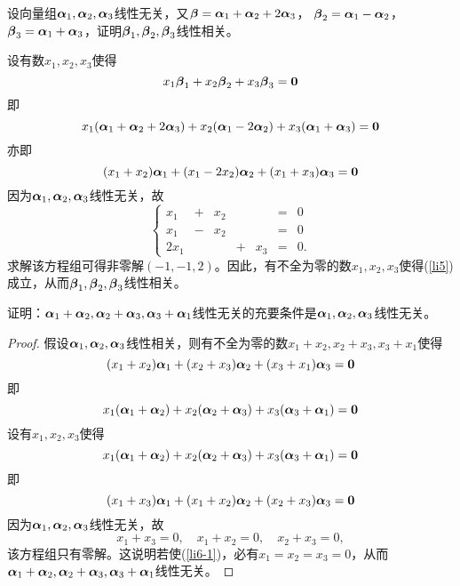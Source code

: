 \begin{frame}
\begin{li}
  设向量组$\boldsymbol{\alpha}_1,\boldsymbol{\alpha}_2,\boldsymbol{\alpha}_3$线性无关，又$\boldsymbol{\beta}=\boldsymbol{\alpha}_1+\boldsymbol{\alpha}_2+2\boldsymbol{\alpha}_3$，
  $\boldsymbol{\beta}_2=\boldsymbol{\alpha}_1-\boldsymbol{\alpha}_2$，$\boldsymbol{\beta}_3=\boldsymbol{\alpha}_1+\boldsymbol{\alpha}_3$，证明$\boldsymbol{\beta}_1,\boldsymbol{\beta}_2,\boldsymbol{\beta}_3$线性相关。       
\end{li} \pause 
\begin{jie}
设有数$x_1,x_2,x_3$使得
\begin{equation}\label{li5}
  x_1\boldsymbol{\beta}_1+x_2\boldsymbol{\beta}_2+x_3\boldsymbol{\beta}_3=\boldsymbol{0}
\end{equation}    
即
$$
x_1(\boldsymbol{\alpha}_1+\boldsymbol{\alpha}_2+2\boldsymbol{\alpha}_3)+x_2(\boldsymbol{\alpha}_1-2\boldsymbol{\alpha}_2)+x_3(\boldsymbol{\alpha}_1+\boldsymbol{\alpha}_3)=\boldsymbol{0}
$$
亦即
$$
(x_1+x_2)\boldsymbol{\alpha}_1+(x_1-2x_2)\boldsymbol{\alpha}_2+(x_1+x_3)\boldsymbol{\alpha}_3=\boldsymbol{0}
$$
因为$\boldsymbol{\alpha}_1,\boldsymbol{\alpha}_2,\boldsymbol{\alpha}_3$线性无关，故
$$
\left\{
\begin{array}{rcrcrcrcr}
  x_1&+&x_2&&&=&0\\
  x_1&-&x_2&&&=&0\\
  2x_1&&&+&x_3&=&0.
\end{array}
\right.
$$
求解该方程组可得非零解$(-1,-1,2)$。因此，有不全为零的数$x_1,x_2,x_3$使得(\ref{li5})成立，从而$\boldsymbol{\beta}_1,\boldsymbol{\beta}_2,\boldsymbol{\beta}_3$线性相关。
\end{jie}
\end{frame}

\begin{frame}
\begin{li}
  证明：$\boldsymbol{\alpha}_1+\boldsymbol{\alpha}_2,\boldsymbol{\alpha}_2+\boldsymbol{\alpha}_3,\boldsymbol{\alpha}_3+\boldsymbol{\alpha}_1$线性无关的充要条件是$\boldsymbol{\alpha}_1,\boldsymbol{\alpha}_2,\boldsymbol{\alpha}_3$线性无关。
\end{li}
\begin{proof}
\red{($\Rightarrow$)} \quad
假设$\boldsymbol{\alpha}_1,\boldsymbol{\alpha}_2,\boldsymbol{\alpha}_3$线性相关，则有不全为零的数$x_1+x_2,x_2+x_3,x_3+x_1$使得
$$
(x_1+x_2)\boldsymbol{\alpha}_1+(x_2+x_3)\boldsymbol{\alpha}_2+(x_3+x_1)\boldsymbol{\alpha}_3=\boldsymbol{0}
$$
即
$$
x_1(\boldsymbol{\alpha}_1+\boldsymbol{\alpha}_2)+x_2(\boldsymbol{\alpha}_2+\boldsymbol{\alpha}_3)+x_3(\boldsymbol{\alpha}_3+\boldsymbol{\alpha}_1)=\boldsymbol{0}
$$
\pause 
\red{($\Leftarrow$)} \quad
设有$x_1,x_2,x_3$使得
\begin{equation}\label{li6-1}
  x_1(\boldsymbol{\alpha}_1+\boldsymbol{\alpha}_2)+x_2(\boldsymbol{\alpha}_2+\boldsymbol{\alpha}_3)+x_3(\boldsymbol{\alpha}_3+\boldsymbol{\alpha}_1)=\boldsymbol{0}
\end{equation}
即
$$
(x_1+x_3)\boldsymbol{\alpha}_1+(x_1+x_2)\boldsymbol{\alpha}_2+(x_2+x_3)\boldsymbol{\alpha}_3=\boldsymbol{0}
$$
因为$\boldsymbol{\alpha}_1,\boldsymbol{\alpha}_2,\boldsymbol{\alpha}_3$线性无关，故
$$
x_1+x_3=0, \quad x_1+x_2=0, \quad x_2+x_3=0,
$$
该方程组只有零解。这说明若使(\ref{li6-1})，必有$x_1=x_2=x_3=0$，从而$\boldsymbol{\alpha}_1+\boldsymbol{\alpha}_2,\boldsymbol{\alpha}_2+\boldsymbol{\alpha}_3,\boldsymbol{\alpha}_3+\boldsymbol{\alpha}_1$线性无关。
\end{proof}
\end{frame}

